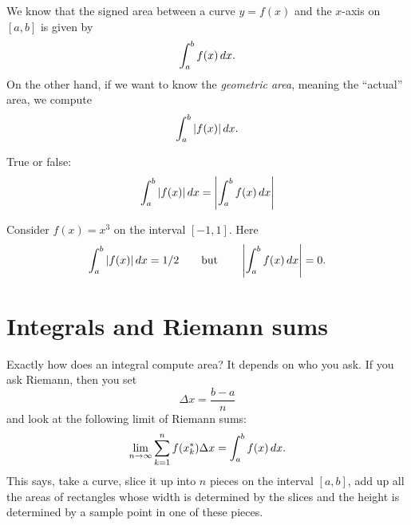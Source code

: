 \documentclass{ximera}
\begin{document}
We know that the signed area between a curve $y=f(x)$ and the $x$-axis
on $[a,b]$ is given by
\[
\int_a^b f(x) \,d x.
\]
On the other hand, if we want to know the \textit{geometric area},
meaning the ``actual'' area, we compute
\[
\int_a^b |f(x)| \,d x.
\]
\begin{question}
  True or false:
  \[
  \int_a^b |f(x)| \,d x = \left|\int_a^b f(x) \,d x\right|
  \]
  \begin{multipleChoice}
  \end{multipleChoice}
  \begin{feedback}
    Consider $f(x) = x^3$ on the interval $[-1,1]$. Here
    \[
    \int_a^b |f(x)| \,d x = 1/2 \qquad\text{but}\qquad \left|\int_a^b
    f(x) \,d x\right| = 0.
    \]
  \end{feedback}
\end{question}



\section{Integrals and Riemann sums}

Exactly how does an integral compute area? It depends on who you
ask. If you ask Riemann, then you set
\[
\Delta x = \frac{b-a}{n}
\]
and look at the following limit of Riemann sums:
\[
\lim_{n\to \infty} \sum_{k=1}^n f(x_k^*) \Delta x = \int_a^b f(x) \,d x.
\]
This says, take a curve, slice it up into $n$ pieces on the interval
$[a,b]$, add up all the areas of rectangles whose width is determined
by the slices and the height is determined by a sample point in one of
these pieces.
\end{document}
